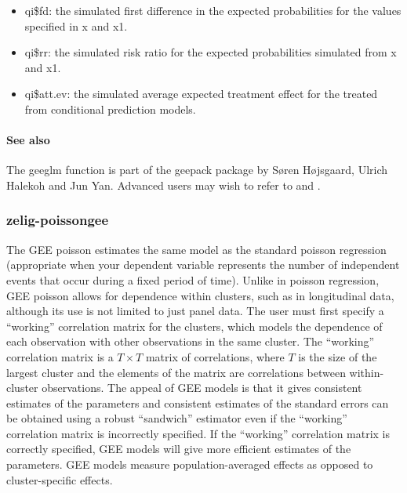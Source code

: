 \documentclass[letterpaper,10pt,english]{sphinxmanual}
\begin{document}
\begin{itemize}
\begin{itemize}
\item {} 
qi\$fd: the simulated first difference in the expected
probabilities for the values specified in x and x1.

\item {} 
qi\$rr: the simulated risk ratio for the expected probabilities
simulated from x and x1.

\item {} 
qi\$att.ev: the simulated average expected treatment effect for the
treated from conditional prediction models.

\end{itemize}

\end{itemize}


\paragraph{See also}
\label{zelig-probitgee:see-also}
The geeglm function is part of the geepack package by Søren Højsgaard,
Ulrich Halekoh and Jun Yan. Advanced users may wish to refer
to  and .


\subsubsection{zelig-poissongee}
\label{zelig-poissongee:zelig-poissongee}\label{zelig-poissongee:zpoissongee}\label{zelig-poissongee::doc}
The GEE poisson estimates the same model as the standard poisson
regression (appropriate when your dependent variable represents the
number of independent events that occur during a fixed period of time).
Unlike in poisson regression, GEE poisson allows for dependence within
clusters, such as in longitudinal data, although its use is not limited
to just panel data. The user must first specify a “working” correlation
matrix for the clusters, which models the dependence of each observation
with other observations in the same cluster. The “working” correlation
matrix is a \(T \times T\) matrix of correlations, where \(T\)
is the size of the largest cluster and the elements of the matrix are
correlations between within-cluster observations. The appeal of GEE
models is that it gives consistent estimates of the parameters and
consistent estimates of the standard errors can be obtained using a
robust “sandwich” estimator even if the “working” correlation matrix is
incorrectly specified. If the “working” correlation matrix is correctly
specified, GEE models will give more efficient estimates of the
parameters. GEE models measure population-averaged effects as opposed to
cluster-specific effects.
\end{document}
